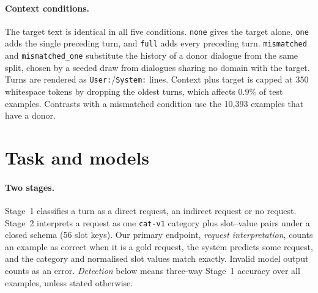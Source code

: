 \documentclass{article}
\begin{document}
\paragraph{Context conditions.}
The target text is identical in all five conditions. \texttt{none} gives the target alone,
\texttt{one} adds the single preceding turn, and \texttt{full} adds every preceding turn.
\texttt{mismatched} and \texttt{mismatched\_one} substitute the history of a donor dialogue from
the same split, chosen by a seeded draw from dialogues sharing no domain with the target.
Turns are rendered as \texttt{User:}/\texttt{System:} lines. Context plus target is capped at 350
whitespace tokens by dropping the oldest turns, which affects 0.9\% of test examples. Contrasts
with a mismatched condition use the 10{,}393 examples that have a donor.

\section{Task and models}
\label{sec:models}

\paragraph{Two stages.}
Stage~1 classifies a turn as a direct request, an indirect request or no request. Stage~2
interprets a request as one \texttt{cat-v1} category plus slot--value pairs under a closed schema
(56 slot keys). Our primary endpoint, \emph{request interpretation}, counts an example as correct
when it is a gold request, the system predicts some request, and the category and normalised slot
values match exactly. Invalid model output counts as an error. \emph{Detection} below means
three-way Stage~1 accuracy over all examples, unless stated otherwise.
\end{document}
